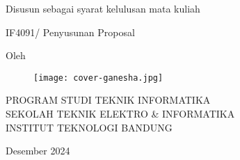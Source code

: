 \clearpage
\pagestyle{empty}

\begin{center}
    \smallskip

    \Large \bfseries \MakeUppercase{\thetitle}
    \vfill


    \large Disusun sebagai syarat kelulusan mata kuliah

    \large IF4091/ Penyusunan Proposal
    \vfill

    \large Oleh

    \Large \theauthor

    \vfill
    \begin{figure}[ht]
        \centering
        \texttt{[image: cover-ganesha.jpg]}
    \end{figure}
    \vfill

    \large
    \uppercase{
        Program Studi Teknik Informatika \\
        Sekolah Teknik Elektro \& Informatika \\
        Institut Teknologi Bandung
    }

    Desember 2024

\end{center}

\clearpage
